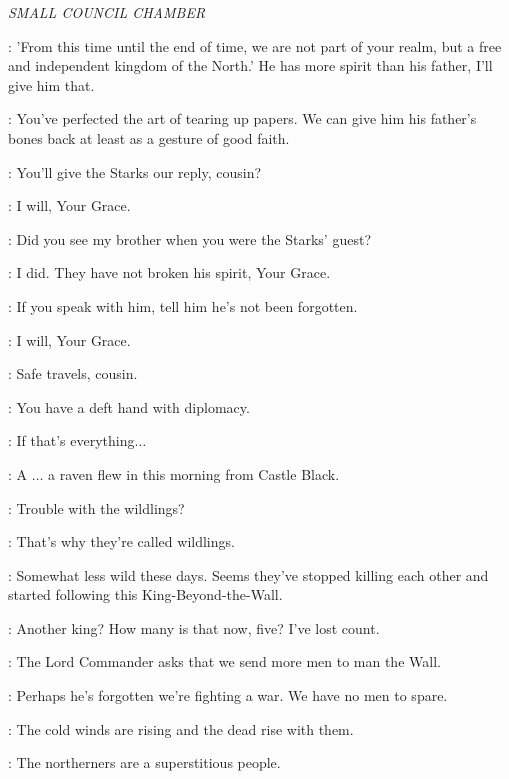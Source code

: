 

\scene

\textit{SMALL COUNCIL CHAMBER}


\CERSEI: 'From this time until the end of time, we are not part of your realm, but a free and independent kingdom of the North.' He has more spirit than his father, I'll give him that.

\TYRION: You've perfected the art of tearing up papers. We can give him his father's bones back at least as a gesture of good faith.

\CERSEI: You'll give the Starks our reply, cousin?

\ALTON: I will, Your Grace.

\CERSEI: Did you see my brother when you were the Starks' guest?

\ALTON: I did. They have not broken his spirit, Your Grace.

\CERSEI: If you speak with him, tell him he's not been forgotten.

\ALTON: I will, Your Grace.

\TYRION: Safe travels, cousin.


\TYRION: You have a deft hand with diplomacy.

\CERSEI: If that's everything$\ldots$

\PYCELLE: A $\ldots$ a raven flew in this morning from Castle Black.


\VARYS: Trouble with the wildlings?

\LITTLEFINGER: That's why they're called wildlings.

\VARYS: Somewhat less wild these days. Seems they've stopped killing each other and started following this King-Beyond-the-Wall.

\CERSEI: Another king? How many is that now, five? I've lost count.

\TYRION: The Lord Commander asks that we send more men to man the Wall.

\CERSEI: Perhaps he's forgotten we're fighting a war. We have no men to spare.

\TYRION: The cold winds are rising and the dead rise with them.

\PYCELLE: The northerners are a superstitious people.

